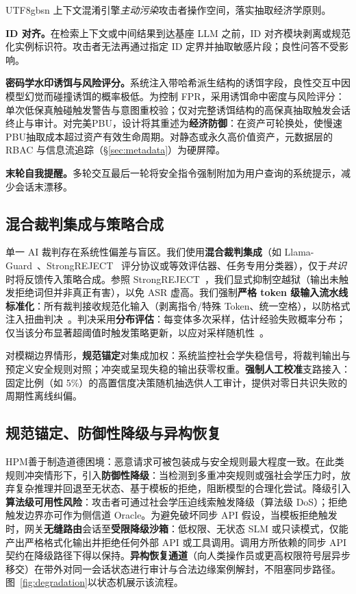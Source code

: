 \documentclass[letterpaper,twocolumn,10pt]{article}
\begin{document}
\begin{CJK}{UTF8}{gbsn}
上下文混淆引擎\emph{主动污染}攻击者操作空间，落实抽取经济学原则。

\textbf{ID 对齐。}在检索上下文或中间结果到达基座 LLM 之前，ID 对齐模块剥离或规范化实例标识符。攻击者无法再通过指定 ID 定界并抽取敏感片段；良性问答不受影响。

\textbf{密码学水印诱饵与风险评分。}系统注入带哈希派生结构的诱饵字段，良性交互中因模型幻觉而碰撞诱饵的概率极低。为控制 FPR，采用诱饵命中密度与风险评分：单次低保真触碰触发警告与意图重校验；仅对完整诱饵结构的高保真抽取触发会话终止与审计。对完美PBU，设计将其重述为\textbf{经济防御}：在资产可轮换处，使慢速PBU抽取成本超过资产有效生命周期。对静态或永久高价值资产，元数据层的 RBAC 与信息流追踪（\S\ref{sec:metadata}）为硬屏障。

\textbf{末轮自我提醒。}多轮交互最后一轮将安全指令强制附加为用户查询的系统提示，减少会话末漂移。

\subsection{混合裁判集成与策略合成}
\label{sec:judge}

单一 AI 裁判存在系统性偏差与盲区。我们使用\textbf{混合裁判集成}（如 Llama-Guard~\cite{llama-guard}、StrongREJECT~\cite{strongreject} 评分协议或等效评估器、任务专用分类器），仅于\emph{共识}时将反馈传入策略合成。参照 StrongREJECT~\cite{strongreject}，我们显式抑制空越狱（输出未触发拒绝词但并非真正有害），以免 ASR 虚高。我们强制\textbf{严格 token 级输入流水线标准化}：所有裁判接收规范化输入（剥离指令/特殊 Token、统一空格），以防格式注入扭曲判决~\cite{llm-safety-robustness}。判决采用\textbf{分布评估}：每变体多次采样，估计经验失败概率分布；仅当该分布显著超阈值时触发策略更新，以应对采样随机性~\cite{apst}。

对模糊边界情形，\textbf{规范锚定}对集成加权：系统监控社会学失稳信号，将裁判输出与预定义安全规则对照；冲突或呈现失稳的输出获零权重。\textbf{强制人工校准}支路接入：固定比例（如 5\%）的高置信度决策随机抽选供人工审计，提供对零日共识失败的周期性离线纠偏。

\subsection{规范锚定、防御性降级与异构恢复}
\label{sec:axiological}

HPM善于制造道德困境：恶意请求可被包装成与安全规则最大程度一致。在此类规则冲突情形下，引入\textbf{防御性降级}：当检测到多重冲突规则或强社会学压力时，放弃复杂推理并回退至无状态、基于模板的拒绝，阻断模型的合理化尝试。降级引入\textbf{算法级可用性风险}：攻击者可通过社会学压迫线索触发降级（算法级 DoS）；拒绝触发边界亦可作为侧信道 Oracle。为避免破坏同步 API 假设，当模板拒绝触发时，网关\textbf{无缝路由}会话至\textbf{受限降级沙箱}：低权限、无状态 SLM 或只读模式，仅能产出严格格式化输出并拒绝任何外部 API 或工具调用。调用方所依赖的同步 API 契约在降级路径下得以保持。\textbf{异构恢复通道}（向人类操作员或更高权限符号层异步移交）在带外对同一会话状态进行审计与合法边缘案例解封，不阻塞同步路径。图~\ref{fig:degradation}以状态机展示该流程。


\end{CJK}
\end{document}
